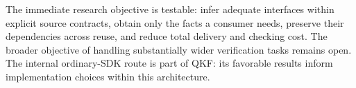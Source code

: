 The immediate research objective is testable: infer adequate interfaces within explicit source contracts, obtain only the facts a consumer needs, preserve their dependencies across reuse, and reduce total delivery and checking cost. The broader objective of handling substantially wider verification tasks remains open. The internal ordinary-SDK route is part of QKF: its favorable results inform implementation choices within this architecture.
